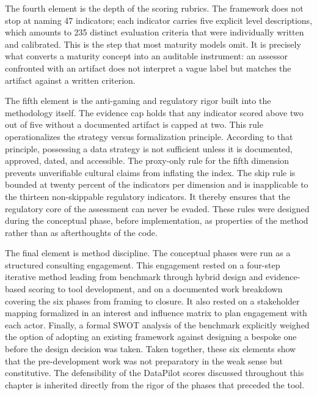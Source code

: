 The fourth element is the depth of the scoring rubrics. The framework does not stop at naming 47 indicators; each indicator carries five explicit level descriptions, which amounts to 235 distinct evaluation criteria that were individually written and calibrated. This is the step that most maturity models omit. It is precisely what converts a maturity concept into an auditable instrument: an assessor confronted with an artifact does not interpret a vague label but matches the artifact against a written criterion.

The fifth element is the anti-gaming and regulatory rigor built into the methodology itself. The evidence cap holds that any indicator scored above two out of five without a documented artifact is capped at two. This rule operationalizes the strategy versus formalization principle. According to that principle, possessing a data strategy is not sufficient unless it is documented, approved, dated, and accessible. The proxy-only rule for the fifth dimension prevents unverifiable cultural claims from inflating the index. The skip rule is bounded at twenty percent of the indicators per dimension and is inapplicable to the thirteen non-skippable regulatory indicators. It thereby ensures that the regulatory core of the assessment can never be evaded. These rules were designed during the conceptual phase, before implementation, as properties of the method rather than as afterthoughts of the code.

The final element is method discipline. The conceptual phases were run as a structured consulting engagement. This engagement rested on a four-step iterative method leading from benchmark through hybrid design and evidence-based scoring to tool development, and on a documented work breakdown covering the six phases from framing to closure. It also rested on a stakeholder mapping formalized in an interest and influence matrix to plan engagement with each actor. Finally, a formal SWOT analysis of the benchmark explicitly weighed the option of adopting an existing framework against designing a bespoke one before the design decision was taken. Taken together, these six elements show that the pre-development work was not preparatory in the weak sense but constitutive. The defensibility of the DataPilot scores discussed throughout this chapter is inherited directly from the rigor of the phases that preceded the tool.

